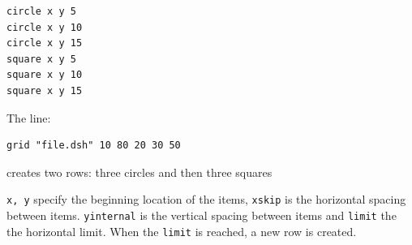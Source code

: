 \begin{verbatim}
circle x y 5
circle x y 10
circle x y 15
square x y 5
square x y 10
square x y 15
\end{verbatim}

The line:

\begin{verbatim}
grid "file.dsh" 10 80 20 30 50
\end{verbatim}

creates two rows: three circles and then three squares

\texttt{x,\ y} specify the beginning location of the items,
\texttt{xskip} is the horizontal spacing between items.
\texttt{yinternal} is the vertical spacing between items and
\texttt{limit} the the horizontal limit. When the \texttt{limit} is
reached, a new row is created.
